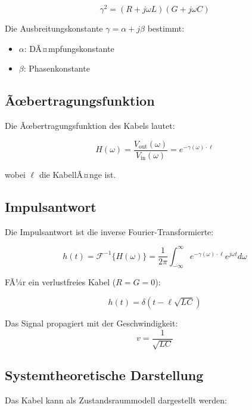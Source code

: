 ﻿\documentclass[12pt,a4paper]{article}
\theoremstyle{definition}
\theoremstyle{remark}
\begin{document}
\begin{equation}
\gamma^2 = (R + j\omega L)(G + j\omega C)
\end{equation}

Die Ausbreitungskonstante $\gamma = \alpha + j\beta$ bestimmt:
\begin{itemize}
\item $\alpha$: DÃ¤mpfungskonstante
\item $\beta$: Phasenkonstante
\end{itemize}

\subsection{Ãœbertragungsfunktion}

Die Ãœbertragungsfunktion des Kabels lautet:

\begin{equation}
H(\omega) = \frac{V_{\text{out}}(\omega)}{V_{\text{in}}(\omega)} = e^{-\gamma(\omega) \cdot \ell}
\end{equation}

wobei $\ell$ die KabellÃ¤nge ist.

\subsection{Impulsantwort}

Die Impulsantwort ist die inverse Fourier-Transformierte:

\begin{equation}
h(t) = \mathcal{F}^{-1}\{H(\omega)\} = \frac{1}{2\pi} \int_{-\infty}^{\infty} e^{-\gamma(\omega) \cdot \ell} e^{j\omega t} d\omega
\end{equation}

FÃ¼r ein verlustfreies Kabel ($R = G = 0$):

\begin{equation}
h(t) = \delta\left(t - \ell\sqrt{LC}\right)
\end{equation}

Das Signal propagiert mit der Geschwindigkeit:
\begin{equation}
v = \frac{1}{\sqrt{LC}}
\end{equation}

\subsection{Systemtheoretische Darstellung}

Das Kabel kann als Zustandsraummodell dargestellt werden:
\end{document}
